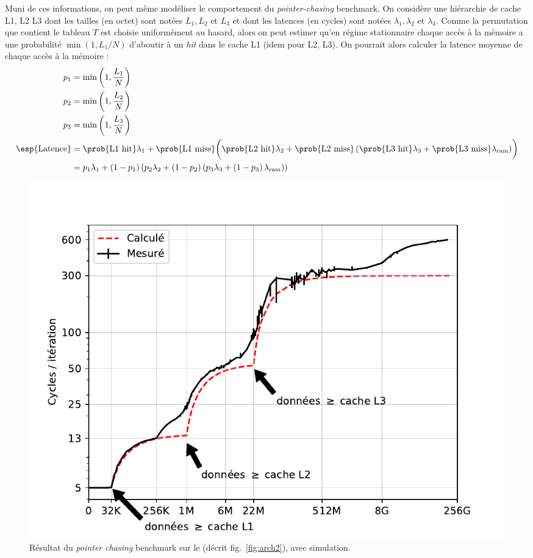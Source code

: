 Muni de ces informations, on peut même modéliser le comportement du
\emph{pointer-chasing} benchmark. On considère une hiérarchie de cache L1, L2 L3
dont les tailles (en octet) sont notées $L_1, L_2$ et $L_3$ et dont les latences
(en cycles) sont notées $\lambda_1, \lambda_2$ et $\lambda_3$. Comme la
permutation que contient le tableau $T$ est choisie uniformément au hasard,
alors on peut estimer qu'en régime stationnaire chaque accès à la mémoire a une
probabilité $\min (1, L_1/N)$ d'aboutir à un \emph{hit} dans le cache L1 (idem
pour L2, L3). On pourrait alors calculer la latence moyenne de chaque accès à la
mémoire :
\begin{align*}
  p_1 &= \min\left(1, \frac{L_1}{N}\right) \\
  p_2 &= \min\left(1, \frac{L_2}{N}\right) \\
  p_3 &= \min\left(1, \frac{L_3}{N}\right) \\
  \esp{\mathrm{Latence}} &= \prob{\text{L1 hit}} \lambda_1 + \prob{\text{L1 miss}}\biggl(\prob{\text{L2 hit}} \lambda_2 + \prob{\text{L2 miss}}\left(\prob{\text{L3 hit}} \lambda_3 + \prob{\text{L3 miss}} \lambda_{\mathrm{ram}} \right)\biggr) \\
  &= p_1 \lambda_1 + \left(1 - p_1\right)\left( p_2 \lambda_2 + \left(1 - p_2\right)\left( p_3 \lambda_3 + \left(1 - p_3\right) \lambda_{\mathrm{ram}} \right)\right)
\end{align*}

\begin{figure}
\includegraphics[width=\textwidth]{cache_curve_gr20_w_proba.pdf}
\caption{Résultat du \emph{pointer chasing} benchmark sur le \og {}\fg (décrit fig.~\ref{fig:arch2}), avec simulation. \label{fig:chasing_gr20_w_proba}}
\end{figure}

